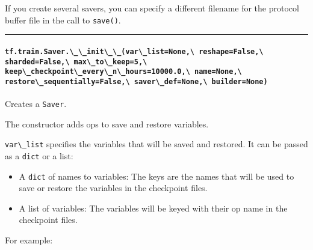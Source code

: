 If you create several savers, you can specify a different filename for
the protocol buffer file in the call to \lstinline{save()}.

\begin{center}\rule{0.5\linewidth}{\linethickness}\end{center}

\paragraph{\texorpdfstring{\lstinline{tf.train.Saver.\_\_init\_\_(var\_list=None,\ reshape=False,\ sharded=False,\ max\_to\_keep=5,\ keep\_checkpoint\_every\_n\_hours=10000.0,\ name=None,\ restore\_sequentially=False,\ saver\_def=None,\ builder=None)}
}{tf.train.Saver.\_\_init\_\_(var\_list=None, reshape=False, sharded=False, max\_to\_keep=5, keep\_checkpoint\_every\_n\_hours=10000.0, name=None, restore\_sequentially=False, saver\_def=None, builder=None) }}\label{tf.train.saver.ux5fux5finitux5fux5fvarux5flistnone-reshapefalse-shardedfalse-maxux5ftoux5fkeep5-keepux5fcheckpointux5feveryux5fnux5fhours10000.0-namenone-restoreux5fsequentiallyfalse-saverux5fdefnone-buildernone}

Creates a \lstinline{Saver}.

The constructor adds ops to save and restore variables.

\lstinline{var\_list} specifies the variables that will be saved and
restored. It can be passed as a \lstinline{dict} or a list:

\begin{itemize}
\tightlist
\item
  A \lstinline{dict} of names to variables: The keys are the names that
  will be used to save or restore the variables in the checkpoint files.
\item
  A list of variables: The variables will be keyed with their op name in
  the checkpoint files.
\end{itemize}

For example:

\begin{Shaded}
\begin{Highlighting}[]
\OperatorTok{=} \OperatorTok{=}\NormalTok{)}
\OperatorTok{=} \OperatorTok{=}\NormalTok{)}

\OperatorTok{=} 

\OperatorTok{=} 
\OperatorTok{=}   \NormalTok{[v1, v2]\})}
\end{Highlighting}
\end{Shaded}

